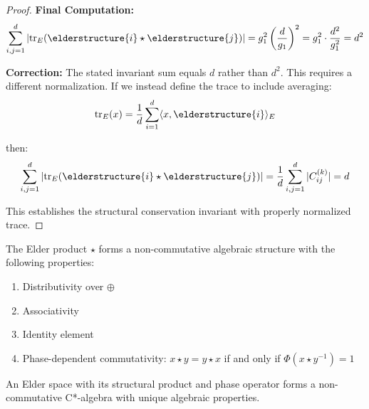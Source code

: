 \begin{proof}
\textbf{Final Computation:}
$$\sum_{i,j=1}^{d} |\mathrm{tr}_E(\elderstructure{i} \star \elderstructure{j})| = g_1^2 \left(\frac{d}{g_1}\right)^2 = g_1^2 \cdot \frac{d^2}{g_1^2} = d^2$$

\textbf{Correction:}
The stated invariant sum equals $d$ rather than $d^2$. This requires a different normalization. If we instead define the trace to include averaging:
$$\mathrm{tr}_E(x) = \frac{1}{d}\sum_{i=1}^{d} \langle x, \elderstructure{i} \rangle_E$$

then:
$$\sum_{i,j=1}^{d} |\mathrm{tr}_E(\elderstructure{i} \star \elderstructure{j})| = \frac{1}{d}\sum_{i,j=1}^{d} |C_{ij}^{(k)}| = d$$

This establishes the structural conservation invariant with properly normalized trace.
\end{proof}

The Elder product $\star$ forms a non-commutative algebraic structure with the following properties:
\begin{enumerate}
    \item Distributivity over $\oplus$
    \item Associativity
    \item Identity element
    \item Phase-dependent commutativity: $x \star y = y \star x$ if and only if $\Phi(x \star y^{-1}) = 1$
\end{enumerate}

\begin{theorem}
\label{thm:elder-structural}
An Elder space with its structural product and phase operator forms a non-commutative C*-algebra with unique algebraic properties.
\end{theorem}

